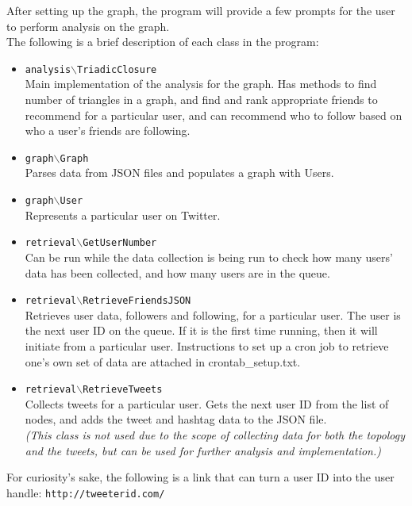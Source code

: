 \documentclass[letterpaper]{article}
\begin{document}
\noindent After setting up the graph, the program will provide a few prompts for the user to perform analysis on the graph.\\

\noindent The following is a brief description of each class in the program:
\begin{itemize}
\item \texttt{analysis$\backslash$TriadicClosure}\\
Main implementation of the analysis for the graph. Has methods to find number of triangles in a graph, and find and rank appropriate friends to recommend for a particular user, and can recommend who to follow based on who a user's friends are following. 

\item \texttt{graph$\backslash$Graph}\\
Parses data from JSON files and populates a graph with Users.

\item \texttt{graph$\backslash$User}\\
Represents a particular user on Twitter.

\item \texttt{retrieval$\backslash$GetUserNumber}\\
Can be run while the data collection is being run to check how many users' data has been collected, and how many users are in the queue.

\item \texttt{retrieval$\backslash$RetrieveFriendsJSON}\\
Retrieves user data, followers and following, for a particular user. The user is the next user ID on the queue. If it is the first time running, then it will initiate from a particular user. Instructions to set up a cron job to retrieve one's own set of data are attached in crontab\_setup.txt.

\item \texttt{retrieval$\backslash$RetrieveTweets}\\
Collects tweets for a particular user. Gets the next user ID from the list of nodes, and adds the tweet and hashtag data to the JSON file.\\
\textit{(This class is not used due to the scope of collecting data for both the topology and the tweets, but can be used for further analysis and implementation.)}
\end{itemize}

For curiosity's sake, the following is a link that can turn a user ID into the user handle: \texttt{http://tweeterid.com/}\\
\end{document}
